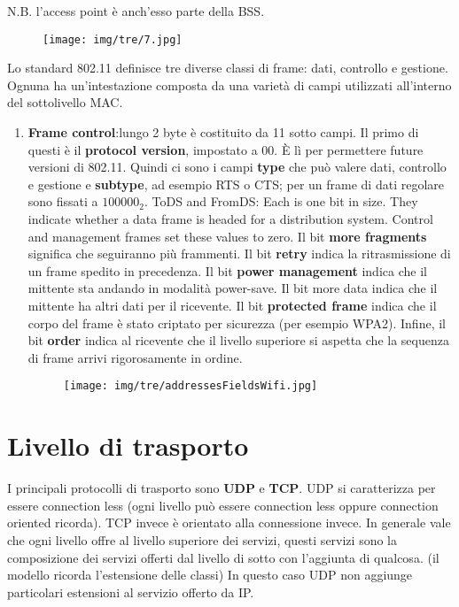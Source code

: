 \documentclass{article}
\begin{document}
\noindent N.B. l'access point è anch'esso parte della BSS. 


\begin{figure}[!ht]
    \begin{center}
        \texttt{[image: img/tre/7.jpg]}         
    \end{center}
\end{figure}

\noindent Lo standard 802.11 definisce tre diverse classi di frame: dati, controllo e gestione. Ognuna
ha un'intestazione composta da una varietà di campi utilizzati all'interno del sottolivello
MAC. \begin{enumerate}
    \item \textbf{Frame control}:lungo 2 byte è costituito da 11 sotto campi. Il primo di questi è il \textbf{protocol version}, impostato a 00.
    È lì per permettere future versioni di 802.11. Quindi ci sono i campi \textbf{type} che può valere dati, controllo e gestione e \textbf{subtype}, 
    ad esempio RTS o CTS; per un frame di dati regolare sono fissati a $100000_2$. ToDS and FromDS: Each is one bit in size. They indicate whether a data frame is headed for a distribution system.
     Control and management frames set these values to zero.
Il bit \textbf{more fragments} significa che seguiranno più frammenti. Il bit \textbf{retry} indica la ritrasmissione di un frame spedito in precedenza. Il bit \textbf{power management}
indica che il mittente sta andando in modalità power-save. Il bit more data indica che il mittente ha altri dati per il ricevente. Il bit \textbf{protected frame} indica
che il corpo del frame è stato criptato per sicurezza (per esempio WPA2). Infine, il bit \textbf{order} indica al ricevente che il livello superiore si aspetta che la sequenza
 di frame arrivi rigorosamente in ordine.


\begin{figure}[!ht]
    \begin{center}
        \texttt{[image: img/tre/addressesFieldsWifi.jpg]}         
    \end{center}
\end{figure}

\end{enumerate} 

\pagebreak
\section{Livello di trasporto}
\noindent I principali protocolli di trasporto sono \textbf{UDP} e \textbf{TCP}. UDP si caratterizza per essere connection less (ogni livello può essere connection less oppure
connection oriented ricorda). TCP invece è orientato alla connessione invece.
In generale vale che ogni livello offre al livello superiore dei servizi, questi servizi sono la composizione dei servizi offerti dal livello di sotto con l'aggiunta di 
qualcosa. (il modello ricorda l'estensione delle classi)
In questo caso UDP non aggiunge particolari estensioni al servizio offerto da IP.
\end{document}
